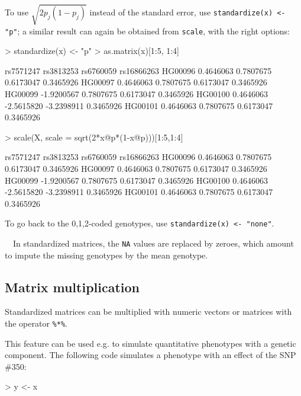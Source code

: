 \documentclass{article}
\renewenvironment{Schunk}{\vspace{\topsep}}{\vspace{\topsep}}
\begin{document}
  To use $\sqrt{2p_j(1-p_j)}$ instead of the standard error, use \verb!standardize(x) <- "p"!; a similar
  result can again be obtained from \verb!scale!, with the right options:
\begin{Schunk}
\begin{Sinput}
> standardize(x) <- "p"
> as.matrix(x)[1:5, 1:4] 
\end{Sinput}
\begin{Soutput}
         rs7571247  rs3813253  rs6760059 rs16866263
HG00096  0.4646063  0.7807675  0.6173047  0.3465926
HG00097  0.4646063  0.7807675  0.6173047  0.3465926
HG00099 -1.9200567  0.7807675  0.6173047  0.3465926
HG00100  0.4646063 -2.5615820 -3.2398911  0.3465926
HG00101  0.4646063  0.7807675  0.6173047  0.3465926
\end{Soutput}
\begin{Sinput}
> scale(X, scale = sqrt(2*x@p*(1-x@p)))[1:5,1:4]
\end{Sinput}
\begin{Soutput}
         rs7571247  rs3813253  rs6760059 rs16866263
HG00096  0.4646063  0.7807675  0.6173047  0.3465926
HG00097  0.4646063  0.7807675  0.6173047  0.3465926
HG00099 -1.9200567  0.7807675  0.6173047  0.3465926
HG00100  0.4646063 -2.5615820 -3.2398911  0.3465926
HG00101  0.4646063  0.7807675  0.6173047  0.3465926
\end{Soutput}
\end{Schunk}

  To go back to the 0,1,2-coded genotypes, use \verb!standardize(x) <- "none"!.

  \ \ In standardized matrices, the \verb!NA! values are replaced by zeroes,
  which amount to impute the missing genotypes by the mean genotype.

\subsection{Matrix multiplication}

  Standardized matrices can be multiplied with numeric vectors or matrices with the operator \verb!%*%!.

  This feature can be used e.g. to simulate quantitative phenotypes with a genetic component. The following
  code simulates a phenotype with an effect of the SNP \#350:
\begin{Schunk}
\begin{Sinput}
> y <- x %
\end{Sinput}
\end{Schunk}
\end{document}
